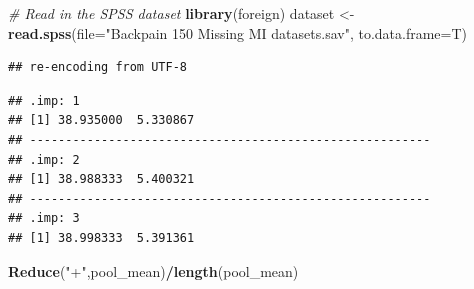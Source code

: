\documentclass[]{book}
\newenvironment{Shaded}{\begin{snugshade}}{\end{snugshade}}
\newcommand{\KeywordTok}[1]{\textcolor[rgb]{0.13,0.29,0.53}{\textbf{#1}}}
\newcommand{\DataTypeTok}[1]{\textcolor[rgb]{0.13,0.29,0.53}{#1}}
\newcommand{\DecValTok}[1]{\textcolor[rgb]{0.00,0.00,0.81}{#1}}
\newcommand{\StringTok}[1]{\textcolor[rgb]{0.31,0.60,0.02}{#1}}
\newcommand{\CommentTok}[1]{\textcolor[rgb]{0.56,0.35,0.01}{\textit{#1}}}
\newcommand{\OtherTok}[1]{\textcolor[rgb]{0.56,0.35,0.01}{#1}}
\newcommand{\ControlFlowTok}[1]{\textcolor[rgb]{0.13,0.29,0.53}{\textbf{#1}}}
\newcommand{\OperatorTok}[1]{\textcolor[rgb]{0.81,0.36,0.00}{\textbf{#1}}}
\newcommand{\NormalTok}[1]{#1}
\begin{document}
\begin{Shaded}
\begin{Highlighting}[]
\CommentTok{# Read in the SPSS dataset}
\KeywordTok{library}\NormalTok{(foreign)}
\NormalTok{dataset <-}\StringTok{ }\KeywordTok{read.spss}\NormalTok{(}\DataTypeTok{file=}\StringTok{"Backpain 150 Missing MI datasets.sav"}\NormalTok{, }\DataTypeTok{to.data.frame=}\NormalTok{T)}
\end{Highlighting}
\end{Shaded}

\begin{verbatim}
## re-encoding from UTF-8
\end{verbatim}

\begin{Shaded}
\end{Shaded}

\begin{verbatim}
## .imp: 1
## [1] 38.935000  5.330867
## -------------------------------------------------------- 
## .imp: 2
## [1] 38.988333  5.400321
## -------------------------------------------------------- 
## .imp: 3
## [1] 38.998333  5.391361
\end{verbatim}

\begin{Shaded}
\begin{Highlighting}[]
\KeywordTok{Reduce}\NormalTok{(}\StringTok{"+"}\NormalTok{,pool_mean)}\OperatorTok{/}\KeywordTok{length}\NormalTok{(pool_mean)}
\end{Highlighting}
\end{Shaded}
\end{document}
